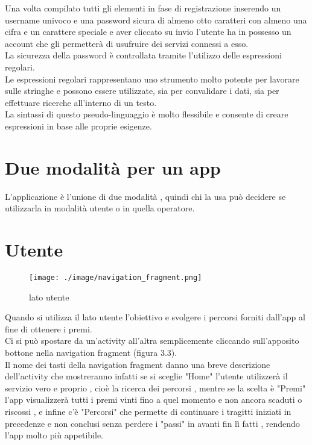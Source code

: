 Una volta compilato tutti gli elementi in fase di registrazione inserendo un username univoco e una password sicura di almeno otto caratteri con almeno una cifra e un carattere speciale e aver cliccato su invio l'utente ha in possesso un account che gli permetterà di usufruire dei servizi connessi a esso.\\
La sicurezza della password è controllata tramite l'utilizzo delle espressioni regolari.\\
Le espressioni regolari rappresentano uno strumento molto potente per lavorare sulle stringhe e possono essere utilizzate, sia per convalidare i dati, sia per effettuare ricerche all'interno di un testo.\\ 
La sintassi di questo pseudo-linguaggio è molto flessibile e consente di creare espressioni in base alle proprie esigenze.


\section{Due modalità per un app}

L'applicazione è l'unione di due modalità , quindi chi la usa può decidere se utilizzarla in modalità utente o in quella operatore.

\section{Utente}

\vspace{2em}

\begin{wrapfigure}{L}{0.45\textwidth}
\centering
\texttt{[image: ./image/navigation\_fragment.png]}
\caption{\label{fig:lato utente}lato utente }
\end{wrapfigure}

Quando si utilizza il lato utente l'obiettivo e svolgere i percorsi forniti dall'app al fine di ottenere i premi.\\[0.2cm]
Ci si può spostare da un'activity all'altra semplicemente cliccando sull'apposito bottone nella navigation fragment (figura 3.3).\\[0.2cm]
Il nome dei tasti della navigation fragment danno una breve descrizione dell'activity che mostreranno infatti se si sceglie "Home" l'utente utilizzerà il servizio vero e proprio , cioè la ricerca dei percorsi , mentre se la scelta è "Premi" l'app visualizzerà tutti i premi vinti fino a quel momento e non ancora scaduti o riscossi , e infine c'è "Percorsi" che permette di continuare i tragitti iniziati in precedenze e non conclusi senza perdere i "passi" in avanti fin lì fatti , rendendo l'app molto più appetibile.
\clearpage
